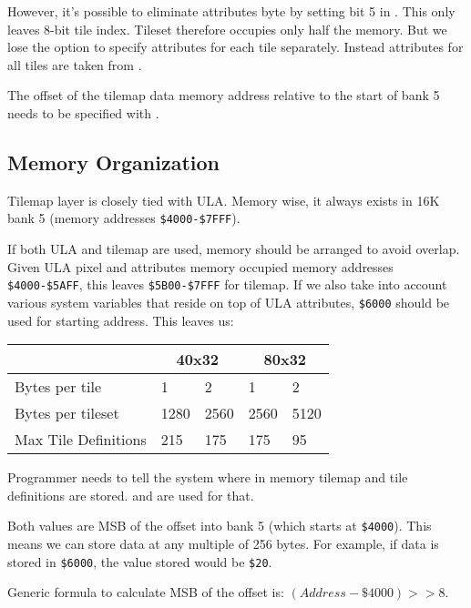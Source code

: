 \documentclass[12pt,twoside,openright,a4paper]{book}
\begin{document}
However, it's possible to eliminate attributes byte by setting bit 5 in . This only leaves 8-bit tile index. Tileset therefore occupies only half the memory. But we lose the option to specify attributes for each tile separately. Instead attributes for all tiles are taken from .

The offset of the tilemap data memory address relative to the start of bank 5 needs to be specified with .


\subsection{Memory Organization}

Tilemap layer is closely tied with ULA. Memory wise, it always exists in 16K bank 5 (memory addresses {\tt \$4000-\$7FFF}).

If both ULA and tilemap are used, memory should be arranged to avoid overlap. Given ULA pixel and attributes memory occupied memory addresses {\tt \$4000-\$5AFF}, this leaves {\tt \$5B00-\$7FFF} for tilemap. If we also take into account various system variables that reside on top of ULA attributes, {\tt \$6000} should be used for starting address. This leaves us:

{
	\def\arraystretch{1.2}
	\begin{tabular}{|l|l|l|l|l|}
		\hline
		& \multicolumn{2}{c|}{40x32} & \multicolumn{2}{c|}{80x32} \\
		\hline
		Bytes per tile & 1 & 2 & 1 & 2 \\
		\hline
		Bytes per tileset & 1280 & 2560 & 2560 & 5120 \\
		\hline
		Max Tile Definitions & 215 & 175 & 175 & 95 \\
		\hline
	\end{tabular}
}

Programmer needs to tell the system where in memory tilemap and tile definitions are stored.  and  are used for that.

Both values are MSB of the offset into bank 5 (which starts at {\tt \$4000}). This means we can store data at any multiple of 256 bytes. For example, if data is stored in {\tt \$6000}, the value stored would be {\tt \$20}.

Generic formula to calculate MSB of the offset is: $(Address - \$4000) >> 8$.
\end{document}
